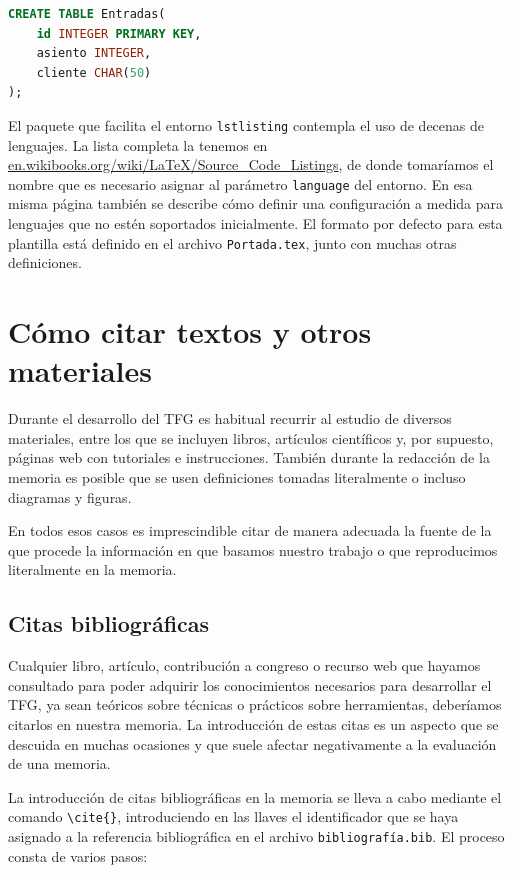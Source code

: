 \begin{lstlisting}[caption={Creación de una tabla con SQL},language=SQL,label=LstCreaTabla]
CREATE TABLE Entradas(
    id INTEGER PRIMARY KEY,
    asiento INTEGER,
    cliente CHAR(50)
);
\end{lstlisting}

El paquete que facilita el entorno \verb|lstlisting| contempla el uso de decenas de lenguajes. La lista completa la tenemos en \url{en.wikibooks.org/wiki/LaTeX/Source_Code_Listings}, de donde tomaríamos el nombre que es necesario asignar al parámetro \texttt{language} del entorno. En esa misma página también se describe cómo definir una configuración a medida para lenguajes que no estén soportados inicialmente. El formato por defecto para esta plantilla está definido en el archivo \texttt{Portada.tex}, junto con muchas otras definiciones.

\section{Cómo citar textos y otros materiales}

Durante el desarrollo del TFG es habitual recurrir al estudio de diversos materiales, entre los que se incluyen libros, artículos científicos y, por supuesto, páginas web con tutoriales e instrucciones. También durante la redacción de la memoria es posible que se usen definiciones tomadas literalmente o incluso diagramas y figuras.

En todos esos casos es imprescindible citar de manera adecuada la fuente de la que procede la información en que basamos nuestro trabajo o que reproducimos literalmente en la memoria. 

\subsection{Citas bibliográficas}

Cualquier libro, artículo, contribución a congreso o recurso web que hayamos consultado para poder adquirir los conocimientos necesarios para desarrollar el TFG, ya sean teóricos sobre técnicas o prácticos sobre herramientas, deberíamos citarlos en nuestra memoria. La introducción de estas citas es un aspecto que se descuida en muchas ocasiones y que suele afectar negativamente a la evaluación de una memoria.

La introducción de citas bibliográficas en la memoria se lleva a cabo mediante el comando \verb|\cite{}|, introduciendo en las llaves el identificador que se haya asignado a la referencia bibliográfica en el archivo \texttt{bibliografía.bib}. El proceso consta de varios pasos:

